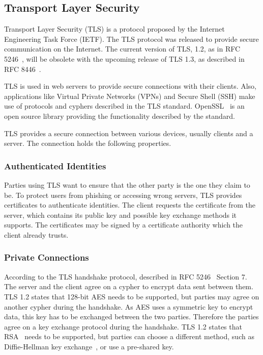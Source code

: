 \subsection{Transport Layer Security}

Transport Layer Security (TLS) is a protocol proposed by the Internet
Engineering Task Force (IETF). The TLS protocol was released to provide secure
communication on the Internet. The current version of TLS, 1.2, as in RFC
5246~\cite{rfc5246}, will be obsolete with the upcoming release of TLS 1.3, as
described in RFC 8446~\cite{rfc8446}.

TLS is used in web servers to provide secure connections with their clients.
Also, applications like Virtual Private Networks (VPNs) and Secure Shell (SSH)
make use of protocols and cyphers described in the TLS standard.
OpenSSL~\cite{opensslweb} is an open source library providing the functionality
described by the standard.

TLS provides a secure connection between various devices, usually clients and a
server. The connection holds the following properties.

\subsubsection{Authenticated Identities}

Parties using TLS want to ensure that the other party is the one they claim to
be. To protect users from phishing or accessing wrong servers, TLS provides
certificates to authenticate identities. The client requests the certificate
from the server, which contains its public key and possible key exchange methods
it supports. The certificates may be signed by a certificate authority which the
client already trusts.

\subsubsection{Private Connections}

According to the TLS handshake protocol, described in RFC 5246~\cite{rfc5246}
Section 7. The server and the client agree on a cypher to encrypt data sent
between them. TLS 1.2 states that 128-bit AES needs to be supported, but parties
may agree on another cypher during the handshake. As AES uses a symmetric key to
encrypt data, this key has to be exchanged between the two parties. Therefore
the parties agree on a key exchange protocol during the handshake. TLS 1.2
states that RSA~\cite{rsapaper} needs to be supported, but parties can choose a
different method, such as Diffie-Hellman key exchange~\cite{deffhellpaper}, or
use a pre-shared key.

